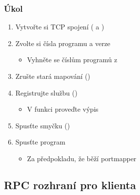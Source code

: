 \begin{frame}
  \frametitle{Úkol}

  \begin{enumerate}
    \item Vytvořte si TCP spojení ( a )
    \item Zvolte si čísla programu a verze
    \begin{itemize}
      \item Vyhněte se číslům programů z 
    \end{itemize}

    \item Zrušte stará mapování ()

    \item Registrujte službu ()
    \begin{itemize}
      \item V  funkci proveďte výpis 
    \end{itemize}

    \item Spusťte smyčku ()
    \item Spusťte program
    \begin{itemize}
      \item Za předpokladu, že běží portmapper
    \end{itemize}
  \end{enumerate}

\end{frame}

\subsection{RPC rozhraní pro klienta}


